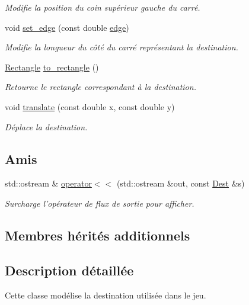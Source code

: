 \begin{DoxyCompactItemize}
\begin{DoxyCompactList}\small\item\em Modifie la position du coin supérieur gauche du carré. \end{DoxyCompactList}\item 
void \hyperlink{classDest_af6c4c76da5373925c8b605faabb187f9}{set\+\_\+edge} (const double \hyperlink{classDest_a3a8acfcc4637300fe240c299881c5c61}{edge})
\begin{DoxyCompactList}\small\item\em Modifie la longueur du côté du carré représentant la destination. \end{DoxyCompactList}\item 
\hyperlink{classRectangle}{Rectangle} \hyperlink{classDest_a5af0475a453bf4ae292907b0f65ecd76}{to\+\_\+rectangle} ()
\begin{DoxyCompactList}\small\item\em Retourne le rectangle correspondant à la destination. \end{DoxyCompactList}\item 
void \hyperlink{classDest_a5a45df42c8960e3bcf510338acc04c99}{translate} (const double x, const double y)
\begin{DoxyCompactList}\small\item\em Déplace la destination. \end{DoxyCompactList}\end{DoxyCompactItemize}
\subsection*{Amis}
\begin{DoxyCompactItemize}
\item 
std\+::ostream \& \hyperlink{classDest_a256a3d2bff5f10395424d5dc911a2b4e}{operator$<$$<$} (std\+::ostream \&out, const \hyperlink{classDest}{Dest} \&s)
\begin{DoxyCompactList}\small\item\em Surcharge l'opérateur de flux de sortie pour afficher. \end{DoxyCompactList}\end{DoxyCompactItemize}
\subsection*{Membres hérités additionnels}


\subsection{Description détaillée}
Cette classe modélise la destination utilisée dans le jeu. 

